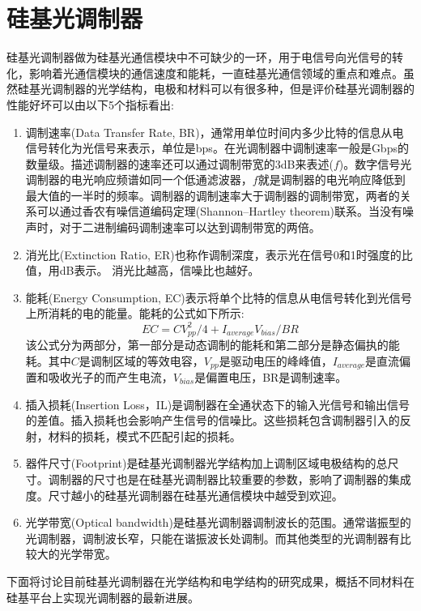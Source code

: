 \section{硅基光调制器}
硅基光调制器做为硅基光通信模块中不可缺少的一环，用于电信号向光信号的转化，影响着光通信模块的通信速度和能耗，一直硅基光通信领域的重点和难点。虽然硅基光调制器的光学结构，电极和材料可以有很多种，但是评价硅基光调制器的性能好坏可以由以下5个指标看出:
\begin{enumerate}[(1)]
	\item 调制速率(Data Transfer Rate, BR)，通常用单位时间内多少比特的信息从电信号转化为光信号来表示，单位是bps。在光调制器中调制速率一般是Gbps的数量级。描述调制器的速率还可以通过调制带宽的3dB来表述($f$)。数字信号光调制器的电光响应频谱如同一个低通滤波器，$f$就是调制器的电光响应降低到最大值的一半时的频率。调制器的调制速率大于调制器的调制带宽，两者的关系可以通过香农有噪信道编码定理(Shannon–Hartley theorem)联系。当没有噪声时，对于二进制编码调制速率可以达到调制带宽的两倍。
	\item 消光比(Extinction Ratio, ER)也称作调制深度，表示光在信号0和1时强度的比值，用dB表示。 消光比越高，信噪比也越好。
	\item 能耗(Energy Consumption, EC)表示将单个比特的信息从电信号转化到光信号上所消耗的电的能量。能耗的公式如下所示:
		\begin{equation}
		\label{Equ:EC}
		EC = CV_{pp}^{2}/4 + I_{average}V_{bias}/BR
		\end{equation}
	该公式分为两部分，第一部分是动态调制的能耗和第二部分是静态偏执的能耗。其中$C$是调制区域的等效电容，$V_{pp}$是驱动电压的峰峰值，$I_{average}$是直流偏置和吸收光子的而产生电流，$V_{bias}$是偏置电压，BR是调制速率。
	\item 插入损耗(Insertion Loss，IL)是调制器在全通状态下的输入光信号和输出信号的差值。插入损耗也会影响产生信号的信噪比。这些损耗包含调制器引入的反射，材料的损耗，模式不匹配引起的损耗。
	\item 器件尺寸(Footprint)是硅基光调制器光学结构加上调制区域电极结构的总尺寸。调制器的尺寸也是在硅基光调制器比较重要的参数，影响了调制器的集成度。尺寸越小的硅基光调制器在硅基光通信模块中越受到欢迎。
	\item 光学带宽(Optical bandwidth)是硅基光调制器调制波长的范围。通常谐振型的光调制器，调制波长窄，只能在谐振波长处调制。而其他类型的光调制器有比较大的光学带宽。	
\end{enumerate}

下面将讨论目前硅基光调制器在光学结构和电学结构的研究成果，概括不同材料在硅基平台上实现光调制器的最新进展。
